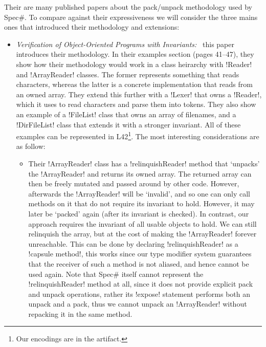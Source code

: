Their are many published papers about the pack/unpack methodology used by Spec\#. To compare against their expressiveness we will consider the three mains ones that introduced their methodology and extensions:
\SSI\begin{itemize}
	\item \emph{Verification of Object-Oriented Programs with Invariants:}~\cite{DBLP:journals/jot/BarnettDFLS04} this paper introduces their methodology. In their examples section (pages 41--47), they show how their methodology would work in a class heirarchy with \Q!Reader! and \Q!ArrayReader! classes. The former represents something that reads characters, whereas the latter is a concrete implementation that reads from an owned array. They extend this further with a \Q!Lexer! that owns a \Q!Reader!, which it uses to read characters and parse them into tokens. They also show an example of a \Q!FileList! class that owns an array of filenames, and a \Q!DirFileList! class that extends it with a stronger invariant. All of these examples can be represented in L42\footnote{Our encodings are in the artifact.}. The most interesting considerations are as follow:
	\begin{itemize}
		\item Their \Q!ArrayReader! class has a \Q!relinquishReader! method that `unpacks' the \Q!ArrayReader! and returns its owned array.
The returned array can then be freely mutated and passed around by other code.
However, afterwards the \Q!ArrayReader! will be `invalid', and so one can only call methods on it that do not require its invariant to hold. However, it may later be `packed' again (after its invariant is checked).
In contrast, our approach requires the invariant of all usable objects to hold.
We can still relinquish the array, but at the cost of making the \Q!ArrayReader! forever unreachable. This can be done by
 declaring \Q!relinquishReader! as a \Q!capsule method!, this works since our type modifier system guarantees that the receiver of such a method is not aliased, and hence cannot be used again. Note that Spec\# itself cannot represent the \Q!relinquishReader! method at all, since it does not provide explicit pack and unpack operations, rather its \Q!expose! statement performs both an unpack and a pack, thus we cannot unpack an \Q!ArrayReader! without repacking it in the same method.

\end{itemize}
\end{itemize}
